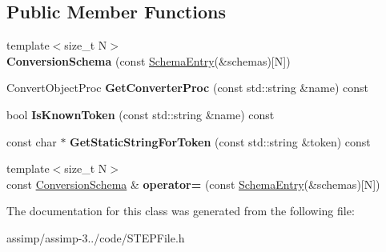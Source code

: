 \subsection*{Public Member Functions}
\begin{DoxyCompactItemize}
\item 
\hypertarget{class_assimp_1_1_s_t_e_p_1_1_e_x_p_r_e_s_s_1_1_conversion_schema_a80423dc26188623f6bfe9545fb3c9d5e}{{\footnotesize template$<$size\+\_\+t N$>$ }\\{\bfseries Conversion\+Schema} (const \hyperlink{struct_assimp_1_1_s_t_e_p_1_1_e_x_p_r_e_s_s_1_1_conversion_schema_1_1_schema_entry}{Schema\+Entry}(\&schemas)\mbox{[}N\mbox{]})}\label{class_assimp_1_1_s_t_e_p_1_1_e_x_p_r_e_s_s_1_1_conversion_schema_a80423dc26188623f6bfe9545fb3c9d5e}

\item 
\hypertarget{class_assimp_1_1_s_t_e_p_1_1_e_x_p_r_e_s_s_1_1_conversion_schema_ae9a686f78790d54bb91b9e0fdf53db7a}{Convert\+Object\+Proc {\bfseries Get\+Converter\+Proc} (const std\+::string \&name) const }\label{class_assimp_1_1_s_t_e_p_1_1_e_x_p_r_e_s_s_1_1_conversion_schema_ae9a686f78790d54bb91b9e0fdf53db7a}

\item 
\hypertarget{class_assimp_1_1_s_t_e_p_1_1_e_x_p_r_e_s_s_1_1_conversion_schema_a028a5b6fb5c48d1ea5f1112949f02a69}{bool {\bfseries Is\+Known\+Token} (const std\+::string \&name) const }\label{class_assimp_1_1_s_t_e_p_1_1_e_x_p_r_e_s_s_1_1_conversion_schema_a028a5b6fb5c48d1ea5f1112949f02a69}

\item 
\hypertarget{class_assimp_1_1_s_t_e_p_1_1_e_x_p_r_e_s_s_1_1_conversion_schema_a81685d2f133a040dca8c5881f86ba9e2}{const char $\ast$ {\bfseries Get\+Static\+String\+For\+Token} (const std\+::string \&token) const }\label{class_assimp_1_1_s_t_e_p_1_1_e_x_p_r_e_s_s_1_1_conversion_schema_a81685d2f133a040dca8c5881f86ba9e2}

\item 
\hypertarget{class_assimp_1_1_s_t_e_p_1_1_e_x_p_r_e_s_s_1_1_conversion_schema_a6c85fe9770db9059752662765e931686}{{\footnotesize template$<$size\+\_\+t N$>$ }\\const \hyperlink{class_assimp_1_1_s_t_e_p_1_1_e_x_p_r_e_s_s_1_1_conversion_schema}{Conversion\+Schema} \& {\bfseries operator=} (const \hyperlink{struct_assimp_1_1_s_t_e_p_1_1_e_x_p_r_e_s_s_1_1_conversion_schema_1_1_schema_entry}{Schema\+Entry}(\&schemas)\mbox{[}N\mbox{]})}\label{class_assimp_1_1_s_t_e_p_1_1_e_x_p_r_e_s_s_1_1_conversion_schema_a6c85fe9770db9059752662765e931686}

\end{DoxyCompactItemize}


The documentation for this class was generated from the following file\+:\begin{DoxyCompactItemize}
\item 
assimp/assimp-\/3../code/S\+T\+E\+P\+File.\+h\end{DoxyCompactItemize}
